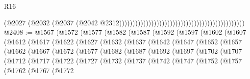 \begin{lexlean}{R16}
\begin{coremodule}
                                                                                          (@2027
                                                                                            (@2032
                                                                                              (@2037
                                                                                                (@2042
                                                                                                  @2312)))))))))))))))))))))))))))))))))))))))))))))))
@2408 := @1567
    (@1572
      (@1577
        (@1582
          (@1587
            (@1592
              (@1597
                (@1602
                  (@1607
                    (@1612
                      (@1617
                        (@1622
                          (@1627
                            (@1632
                              (@1637
                                (@1642
                                  (@1647
                                    (@1652
                                      (@1657
                                        (@1662
                                          (@1667
                                            (@1672
                                              (@1677
                                                (@1682
                                                  (@1687
                                                    (@1692
                                                      (@1697
                                                        (@1702
                                                          (@1707
                                                            (@1712
                                                              (@1717
                                                                (@1722
                                                                  (@1727
                                                                    (@1732
                                                                      (@1737
                                                                        (@1742
                                                                          (@1747
                                                                            (@1752
                                                                              (@1757
                                                                                (@1762
                                                                                  (@1767
                                                                                    (@1772

\end{coremodule}
\end{lexlean}
